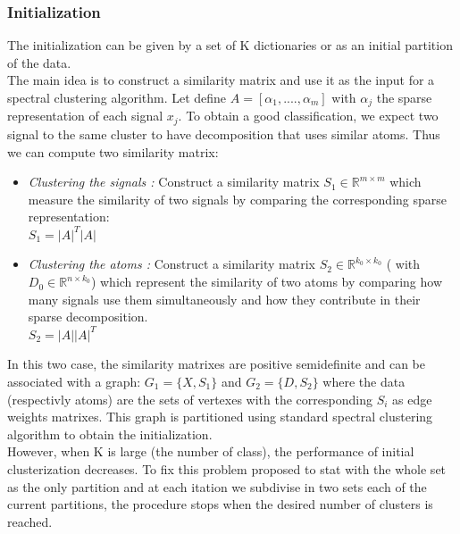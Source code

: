 \documentclass[a4paper,10pt]{article}
\newcommand{\R}{\mathbb{R}}
\begin{document}
\subsubsection{Initialization}
The initialization can be given by a set of K dictionaries or as an initial partition of the data.\\
The main idea is to construct a similarity matrix and use it as the input for a spectral clustering algorithm. Let define $A = [\alpha_1,....,  \alpha_m]$ with $\alpha_j$ the sparse representation of each signal $x_j$. To obtain a good classification, we expect two signal to the same cluster to have decomposition that uses similar atoms. Thus we can compute two similarity matrix:
\begin{itemize}
 \item \textit{Clustering the signals :} Construct a similarity matrix $S_1 \in \R^{m \times m}$ which measure the similarity of two signals by comparing the corresponding sparse representation:\\
 $S_1 = |A|^T |A|$
 \item \textit{Clustering the atoms :} Construct a similarity matrix $S_2 \in \R^{k_0 \times k_0}$ ( with $D_0 \in \R^{n \times k_0}$) which represent the similarity of two atoms by comparing how many signals use them simultaneously and how they contribute in their sparse decomposition.\\
 $S_2 = |A||A|^T$
\end{itemize}
In this two case, the similarity matrixes are positive semidefinite and can be associated with a graph: $G_1 = \{X,S_1\}$ and $G_2 = \{D,S_2\}$ where the data (respectivly atoms) are the sets of vertexes with the corresponding $S_i$ as edge weights matrixes. This graph is partitioned using standard spectral clustering algorithm to obtain the initialization.\\
However, when K is large (the number of class), the performance of initial clusterization decreases. To fix this problem \cite{5494985} proposed to stat with the whole set as the only partition and at each itation we subdivise in two sets each of the current partitions, the procedure stops when the desired number of clusters is reached.

\newpage
\end{document}
